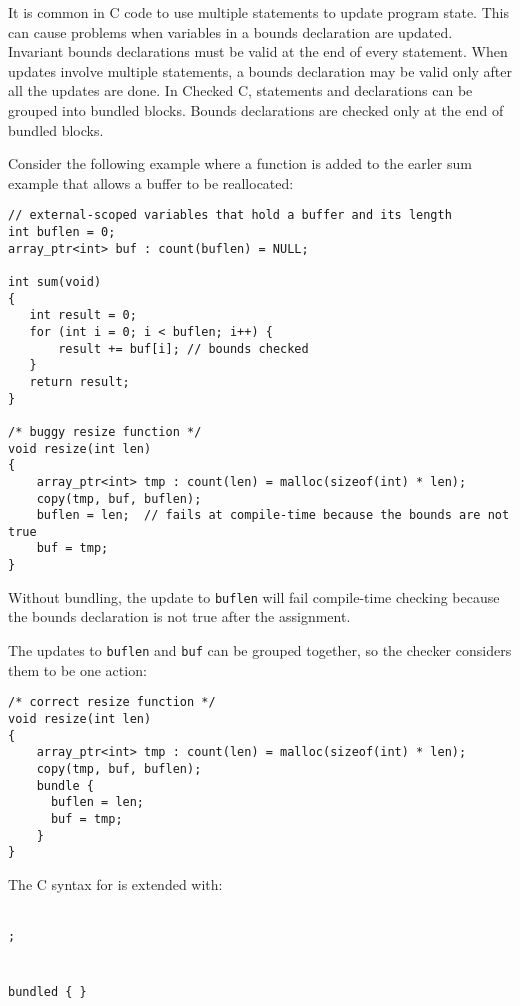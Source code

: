 It is common in C code to use multiple statements to update program state.
This can cause problems when variables in a bounds declaration are updated.
Invariant bounds declarations must be valid at the end of every statement.
When updates involve multiple statements, a bounds declaration may be valid only
after all the updates are done.  In Checked C, statements and declarations can be 
grouped into bundled blocks.  Bounds declarations are checked only at the end of bundled blocks.

Consider the following example where a function is added to the earler sum
example that allows a buffer to be reallocated:
\begin{verbatim}
// external-scoped variables that hold a buffer and its length
int buflen = 0;
array_ptr<int> buf : count(buflen) = NULL;

int sum(void)
{
   int result = 0;
   for (int i = 0; i < buflen; i++) {
       result += buf[i]; // bounds checked
   }
   return result;
}

/* buggy resize function */
void resize(int len) 
{
    array_ptr<int> tmp : count(len) = malloc(sizeof(int) * len);
    copy(tmp, buf, buflen);
    buflen = len;  // fails at compile-time because the bounds are not true
    buf = tmp;
}
\end{verbatim}
Without bundling, the update to \texttt{buflen} will fail
compile-time checking because the bounds declaration is not true after the
assignment.

The updates to \texttt{buflen} and \texttt{buf} can be grouped together,
so the checker considers them to be one action:
\begin{verbatim}
/* correct resize function */
void resize(int len) 
{
    array_ptr<int> tmp : count(len) = malloc(sizeof(int) * len);
    copy(tmp, buf, buflen);
    bundle {
      buflen = len;
      buf = tmp;
    }
}
\end{verbatim}

The C syntax for is extended with:
\begin{tabbing}
\=\\
\>\texttt{;} \\
\\
 \\
\>\texttt{bundled \{  \}} \\
\\
\\
\>  \\
\>  \\
\\
\\
\> \\
\>  
\end{tabbing}

